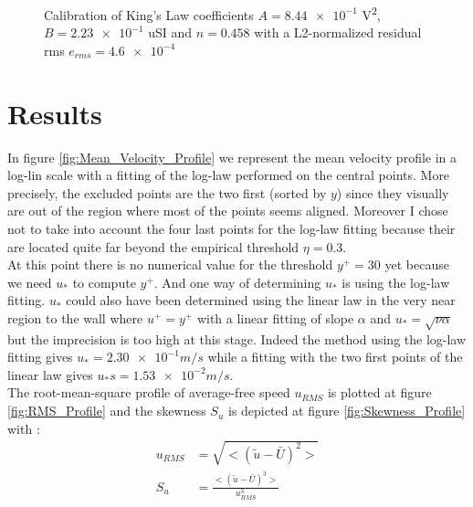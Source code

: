 \documentclass[12pt]{article}
\begin{document}
\begin{figure}
    \centering
    \resizebox{0.6\linewidth}{!}{}
    \caption{Calibration of King's Law coefficients $A = \num{8.44e-1}$ \si{V^2}, $B = \num{2.23e-1}$ \si{uSI} and $n=0.458$ with a L2-normalized residual rms $e_{rms} = \num{4.6e-4}$}
    \label{fig:AnemometerFitting}
\end{figure}



\section{Results}

In figure \ref{fig:Mean_Velocity_Profile} we represent the mean velocity profile in a log-lin scale with a fitting of the log-law performed on the central points. More precisely, the excluded points are the two first (sorted by $y$) since they visually are out of the region where most of the points seems aligned.  Moreover I chose not to take into account the four last points for the log-law fitting because their are located quite far beyond the empirical threshold $\eta = 0.3$. \\

At this point there is no numerical value for the threshold $y^+=30$ yet because we need $u_*$ to compute $y^+$. And one way of determining $u_*$ is using the log-law fitting. $u_*$ could also have been determined using the linear law in the very near region to the wall where $u^+ = y^+$ with a linear fitting of slope $\alpha$ and $u_* = \sqrt{\nu\alpha}$ but the imprecision is too high at this stage. Indeed the method using the log-law fitting gives $u_* = \num{2.30e-1} \si{m/s}$ while a fitting with the two first points of the linear law gives $u_*s = \num{1.53e-2} \si{m/s}$.\\

The root-mean-square profile of average-free speed $u_{RMS}$ is plotted at figure \ref{fig:RMS_Profile} and the skewness $S_u$ is depicted at figure \ref{fig:Skewness_Profile} with :\\

\begin{align}
    u_{RMS} &= \sqrt{<\left(\tilde{u}-\bar{U}\right)^2>} \\
    S_u &= \frac{<\left(\tilde{u}-\bar{U}\right)^3>}{u_{RMS}^3}
\end{align}
\end{document}
